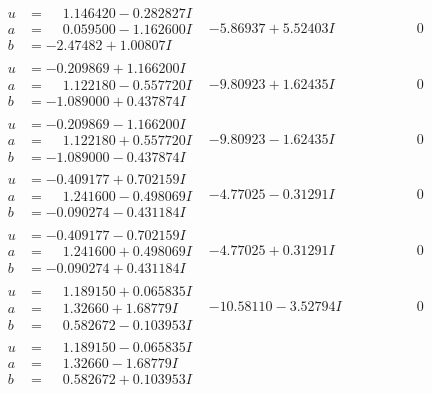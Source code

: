 \documentclass[1p]{elsarticle_modified}
\theoremstyle{definition}
\begin{document}
$$\begin{array}{c|c|c}
\begin{aligned}
u &= \phantom{-}1.146420 - 0.282827 I \\
a &= \phantom{-}0.059500 - 1.162600 I \\
b &= -2.47482 + 1.00807 I\end{aligned}
 & -5.86937 + 5.52403 I & \phantom{-0.000000 } 0 \\ \hline\begin{aligned}
u &= -0.209869 + 1.166200 I \\
a &= \phantom{-}1.122180 - 0.557720 I \\
b &= -1.089000 + 0.437874 I\end{aligned}
 & -9.80923 + 1.62435 I & \phantom{-0.000000 } 0 \\ \hline\begin{aligned}
u &= -0.209869 - 1.166200 I \\
a &= \phantom{-}1.122180 + 0.557720 I \\
b &= -1.089000 - 0.437874 I\end{aligned}
 & -9.80923 - 1.62435 I & \phantom{-0.000000 } 0 \\ \hline\begin{aligned}
u &= -0.409177 + 0.702159 I \\
a &= \phantom{-}1.241600 - 0.498069 I \\
b &= -0.090274 - 0.431184 I\end{aligned}
 & -4.77025 - 0.31291 I & \phantom{-0.000000 } 0 \\ \hline\begin{aligned}
u &= -0.409177 - 0.702159 I \\
a &= \phantom{-}1.241600 + 0.498069 I \\
b &= -0.090274 + 0.431184 I\end{aligned}
 & -4.77025 + 0.31291 I & \phantom{-0.000000 } 0 \\ \hline\begin{aligned}
u &= \phantom{-}1.189150 + 0.065835 I \\
a &= \phantom{-}1.32660 + 1.68779 I \\
b &= \phantom{-}0.582672 - 0.103953 I\end{aligned}
 & -10.58110 - 3.52794 I & \phantom{-0.000000 } 0 \\ \hline\begin{aligned}
u &= \phantom{-}1.189150 - 0.065835 I \\
a &= \phantom{-}1.32660 - 1.68779 I \\
b &= \phantom{-}0.582672 + 0.103953 I\end{aligned}

\end{array}$$
\end{document}
